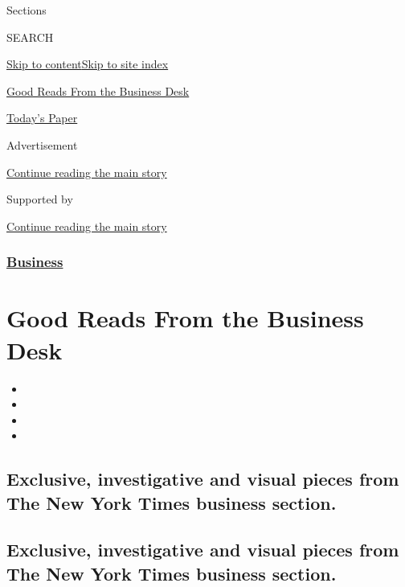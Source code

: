Sections

SEARCH

\protect\hyperlink{site-content}{Skip to
content}\protect\hyperlink{site-index}{Skip to site index}

\href{https://www.nytimes.com/spotlight/editors-picks-business}{Good
Reads From the Business Desk}

\href{https://myaccount.nytimes.com/auth/login?response_type=cookie\&client_id=vi}{}

\href{https://www.nytimes.com/section/todayspaper}{Today's Paper}

Advertisement

\protect\hyperlink{after-top}{Continue reading the main story}

Supported by

\protect\hyperlink{after-sponsor}{Continue reading the main story}

\hypertarget{business}{%
\subsubsection{\texorpdfstring{\href{/section/business}{Business}}{Business}}\label{business}}

\hypertarget{good-reads-from-the-business-desk}{%
\section{Good Reads From the Business
Desk}\label{good-reads-from-the-business-desk}}

\begin{itemize}
\item
\item
\item
\item
\end{itemize}

\hypertarget{exclusive-investigative-and-visual-pieces-from-the-new-york-times-business-section}{%
\subsection{Exclusive, investigative and visual pieces from The New York
Times business
section.}\label{exclusive-investigative-and-visual-pieces-from-the-new-york-times-business-section}}

\hypertarget{exclusive-investigative-and-visual-pieces-from-the-new-york-times-business-section-1}{%
\subsection{Exclusive, investigative and visual pieces from The New York
Times business
section.}\label{exclusive-investigative-and-visual-pieces-from-the-new-york-times-business-section-1}}


